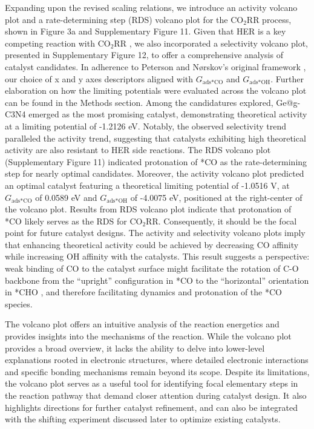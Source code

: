 Expanding upon the revised scaling relations, we introduce an activity volcano plot and a rate-determining step (RDS) volcano plot for the CO$_2$RR process, shown in Figure 3a and Supplementary Figure 11.
Given that HER is a key competing reaction with CO$_2$RR \cite{goyal2020competition}, we also incorporated a selectivity volcano plot, presented in Supplementary Figure 12, to offer a comprehensive analysis of catalyst candidates.
In adherence to Peterson and Nørskov's original framework \cite{peterson2012activity}, our choice of x and y axes descriptors aligned with $\textit{G}_{\text{ads} \ast \text{CO}}$ and $\textit{G}_{\text{ads} \ast \text{OH}}$.
Further elaboration on how the limiting potentials were evaluated across the volcano plot can be found in the Methods section.
Among the candidatures explored, Ge@g-C3N4 emerged as the most promising catalyst, demonstrating theoretical activity at a limiting potential of -1.2126 eV.
Notably, the observed selectivity trend paralleled the activity trend, suggesting that catalysts exhibiting high theoretical activity are also resistant to HER side reactions.
The RDS volcano plot (Supplementary Figure 11) indicated protonation of *CO as the rate-determining step for nearly optimal candidates.
Moreover, the activity volcano plot predicted an optimal catalyst featuring a theoretical limiting potential of -1.0516 V, at $\textit{G}_{\text{ads} \ast \text{CO}}$ of 0.0589 eV and $\textit{G}_{\text{ads} \ast \text{OH}}$ of -4.0075 eV, positioned at the right-center of the volcano plot.
Results from RDS volcano plot indicate that protonation of *CO likely serves as the RDS for CO$_2$RR.
Consequently, it should be the focal point for future catalyst designs.
The activity and selectivity volcano plots imply that enhancing theoretical activity could be achieved by decreasing CO affinity while increasing OH affinity with the catalysts.
This result suggests a perspective: weak binding of CO to the catalyst surface might facilitate the rotation of C-O backbone from the “upright” configuration in *CO to the “horizontal” orientation in *CHO \cite{peterson2010copper},
and therefore facilitating dynamics and protonation of the *CO species.

The volcano plot offers an intuitive analysis of the reaction energetics and provides insights into the mechanisms of the reaction.
While the volcano plot provides a broad overview, it lacks the ability to delve into lower-level explanations rooted in electronic structures, where detailed electronic interactions and specific bonding mechanisms remain beyond its scope.
Despite its limitations, the volcano plot serves as a useful tool for identifying focal elementary steps in the reaction pathway that demand closer attention during catalyst design.
It also highlights directions for further catalyst refinement, and can also be integrated with the shifting experiment discussed later to optimize existing catalysts.

